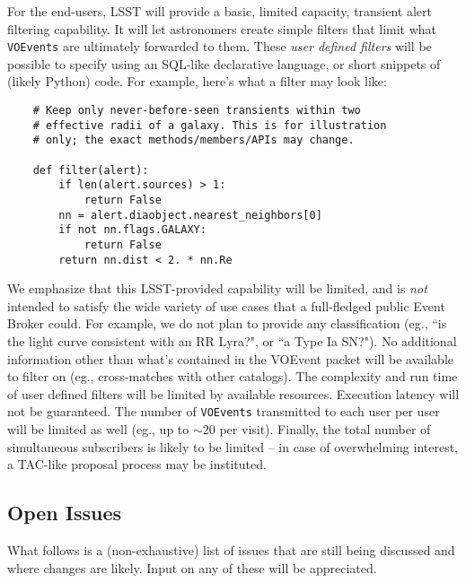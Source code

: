 \documentclass[12pt]{article}
\newcommand{\code}[1]{\texttt{#1}}
\newcommand{\VOEvents}{\code{VOEvents}\xspace}
\begin{document}
For the end-users, LSST will provide a basic, limited capacity, transient alert filtering capability. It will let astronomers create simple filters that limit what \VOEvents are ultimately forwarded to them. These {\em user defined filters} will be possible to specify using an SQL-like declarative language, or short snippets of (likely Python) code. For example, here's what a filter may look like:
\begin{verbatim}
    # Keep only never-before-seen transients within two
    # effective radii of a galaxy. This is for illustration 
    # only; the exact methods/members/APIs may change.
    
    def filter(alert):
        if len(alert.sources) > 1:
            return False
        nn = alert.diaobject.nearest_neighbors[0]
        if not nn.flags.GALAXY:
            return False
        return nn.dist < 2. * nn.Re
\end{verbatim}

We emphasize that this LSST-provided capability will be limited, and is {\em not} intended to satisfy the wide variety of use cases that a full-fledged public Event Broker could. For example, we do not plan to provide any classification (eg., ``is the light curve consistent with an RR Lyra?", or ``a Type Ia SN?"). No additional information other than what's contained in the VOEvent packet will be available to filter on (eg., cross-matches with other catalogs). The complexity and run time of user defined filters will be limited by available resources. Execution latency will not be guaranteed. The number of \VOEvents transmitted to each user per user will be limited as well (eg., up to $\sim 20$ per visit). Finally, the total number of simultaneous subscribers is likely to be limited -- in case of overwhelming interest, a TAC-like proposal process may be instituted.

\subsection{Open Issues}

What follows is a (non-exhaustive) list of issues that are still being discussed and where changes are likely. Input on any of these will be appreciated.
\end{document}
